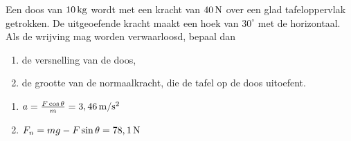 \item Een doos van $10\rm\,kg$ wordt met een kracht van $40\rm\,N$ over een glad tafeloppervlak getrokken. De uitgeoefende kracht maakt een hoek van $30^\circ$ met de horizontaal. Als de wrijving mag worden verwaarloosd, bepaal dan
\newline
%
%
\begin{minipage}[t]{.6\linewidth}
\begin{enumerate}
\item de versnelling van de doos,
\item de grootte van de normaalkracht, die de tafel op de doos uitoefent.
\end{enumerate}
\end{minipage}
\begin{minipage}[t]{.4\linewidth}
\end{minipage}
%
%
%
\begin{oplossing}
\begin{enumerate}
\item $a=\frac{F\cos\theta}{m}=3,46\rm\,m/s^2$
\item $F_n=mg-F\sin\theta=78,1\rm\,N$
\end{enumerate}
\end{oplossing}
